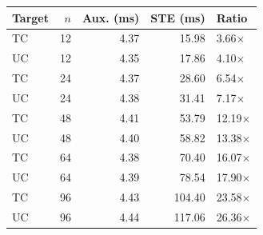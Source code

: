 \begin{tabular}{@{}lrrrl@{}}
\toprule
Target & $n$ & Aux. (ms) & STE (ms) & Ratio\\
\midrule
TC & 12 & 4.37 & 15.98 & 3.66$\times$\\
UC & 12 & 4.35 & 17.86 & 4.10$\times$\\
TC & 24 & 4.37 & 28.60 & 6.54$\times$\\
UC & 24 & 4.38 & 31.41 & 7.17$\times$\\
TC & 48 & 4.41 & 53.79 & 12.19$\times$\\
UC & 48 & 4.40 & 58.82 & 13.38$\times$\\
TC & 64 & 4.38 & 70.40 & 16.07$\times$\\
UC & 64 & 4.39 & 78.54 & 17.90$\times$\\
TC & 96 & 4.43 & 104.40 & 23.58$\times$\\
UC & 96 & 4.44 & 117.06 & 26.36$\times$\\
\bottomrule
\end{tabular}
